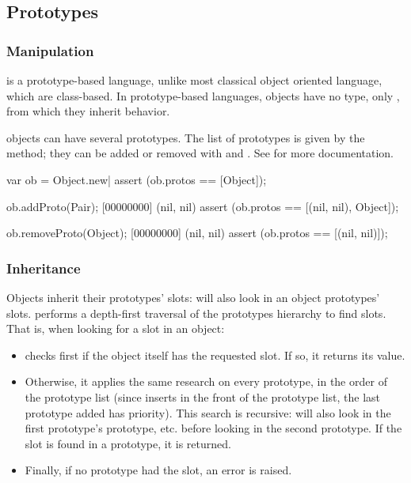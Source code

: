 \subsection{Prototypes}

\subsubsection{Manipulation}

\us is a prototype-based language, unlike most classical object oriented
language, which are class-based. In prototype-based languages, objects have
no type, only , from which they inherit behavior.

\us objects can have several prototypes. The list of prototypes is given by
the  method; they can be added or removed with
 and .  See
 for more documentation.

\begin{urbiscript}
var ob = Object.new|
assert (ob.protos == [Object]);

ob.addProto(Pair);
[00000000] (nil, nil)
assert (ob.protos == [(nil, nil), Object]);

ob.removeProto(Object);
[00000000] (nil, nil)
assert (ob.protos == [(nil, nil)]);
\end{urbiscript}

\subsubsection{Inheritance}

Objects inherit their prototypes' slots:  will also
look in an object prototypes' slots.  performs a
depth-first traversal of the prototypes hierarchy to find slots. That is,
when looking for a slot in an object:

\begin{itemize}
\item {} checks first if the object itself has the
  requested slot. If so, it returns its value.
\item Otherwise, it applies the same research on every prototype, in the
  order of the prototype list (since  inserts in
  the front of the prototype list, the last prototype added has
  priority). This search is recursive:  will also
  look in the first prototype's prototype, etc. before looking in the second
  prototype. If the slot is found in a prototype, it is returned.
\item Finally, if no prototype had the slot, an error is raised.
\end{itemize}

